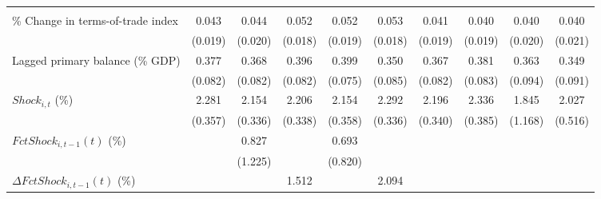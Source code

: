 {\begin{tabular}{l*{9}{c}}
                    &                     &                     &                     &                     &                     &                     &                     &                     &                     \\
\addlinespace
\% Change in terms-of-trade index&       0.043\sym{**} &       0.044\sym{**} &       0.052\sym{***}&       0.052\sym{**} &       0.053\sym{***}&       0.041\sym{**} &       0.040\sym{**} &       0.040\sym{*}  &       0.040\sym{*}  \\
                    &     (0.019)         &     (0.020)         &     (0.018)         &     (0.019)         &     (0.018)         &     (0.019)         &     (0.019)         &     (0.020)         &     (0.021)         \\
\addlinespace
Lagged primary balance (\% GDP)&       0.377\sym{***}&       0.368\sym{***}&       0.396\sym{***}&       0.399\sym{***}&       0.350\sym{***}&       0.367\sym{***}&       0.381\sym{***}&       0.363\sym{***}&       0.349\sym{***}\\
                    &     (0.082)         &     (0.082)         &     (0.082)         &     (0.075)         &     (0.085)         &     (0.082)         &     (0.083)         &     (0.094)         &     (0.091)         \\
\addlinespace
$ Shock_{i,t}$ (\%) &       2.281\sym{***}&       2.154\sym{***}&       2.206\sym{***}&       2.154\sym{***}&       2.292\sym{***}&       2.196\sym{***}&       2.336\sym{***}&       1.845         &       2.027\sym{***}\\
                    &     (0.357)         &     (0.336)         &     (0.338)         &     (0.358)         &     (0.336)         &     (0.340)         &     (0.385)         &     (1.168)         &     (0.516)         \\
\addlinespace
$ FctShock_{i,t-1}(t)$ (\%)&                     &       0.827         &                     &       0.693         &                     &                     &                     &                     &                     \\
                    &                     &     (1.225)         &                     &     (0.820)         &                     &                     &                     &                     &                     \\
\addlinespace
$ \Delta FctShock_{i,t-1}(t)$ (\%)&                     &                     &       1.512\sym{*}  &                     &       2.094\sym{**} &                     &                     &                     &                     \\

\end{tabular}}
